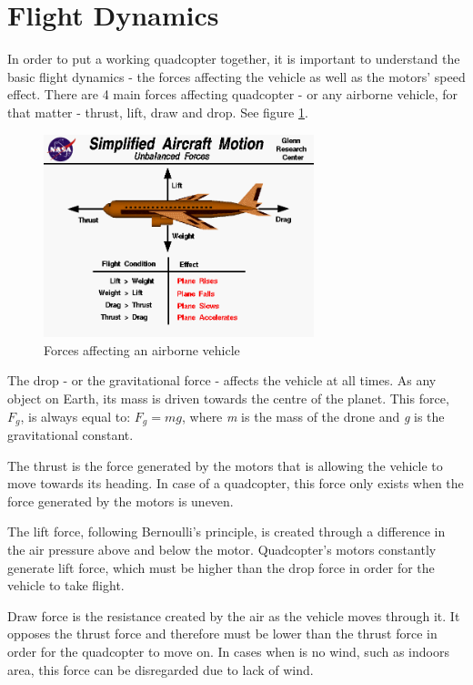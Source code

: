 \clearpage

\section{Flight Dynamics}

In order to put a working quadcopter together, it is important to understand the basic flight dynamics - the forces affecting the vehicle as well as the motors' speed effect.
There are 4 main forces affecting quadcopter - or any airborne vehicle, for that matter - thrust, lift, draw and drop. See figure \ref{droneForces}.
\begin{figure}[H]
  \centering
    \includegraphics[width=0.7\textwidth]{images/droneForces.png}
	\caption{Forces affecting an airborne vehicle\cite{dForces}}
	\label{droneForces}
\end{figure}

The drop - or the gravitational force - affects the vehicle at all times. As any object on Earth, its mass is driven towards the centre of the planet. This force, \textit{$F_g$}, is always equal to: $F_g = mg$, where \textit{m} is the mass of the drone and \textit{g} is the gravitational constant.

The thrust is the force generated by the motors that is allowing the vehicle to move towards its heading. In case of a quadcopter, this force only exists when the force generated by the motors is uneven.

The lift force, following Bernoulli's principle, is created through a difference in the air pressure above and below the motor. Quadcopter's motors constantly generate lift force, which must be higher than the drop force in order for the vehicle to take flight.

Draw force is the resistance created by the air as the vehicle moves through it. It opposes the thrust force and therefore must be lower than the thrust force in order for the quadcopter to move on. In cases when is no wind, such as indoors area, this force can be disregarded due to lack of wind.

